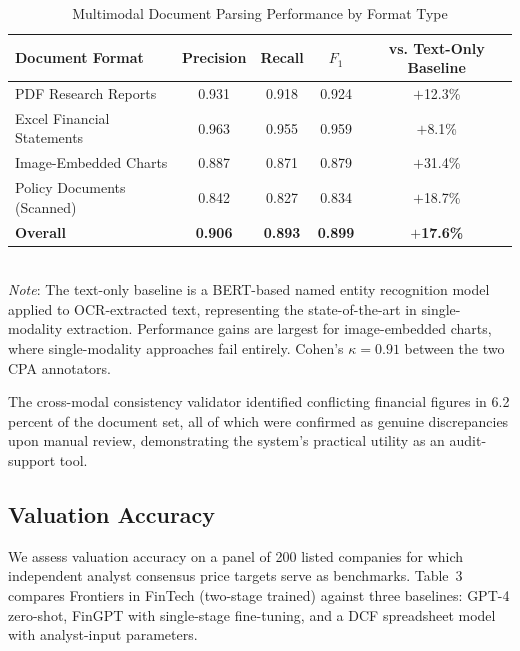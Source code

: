 \documentclass[12pt,letterpaper]{article}
\begin{document}
\begin{table}[H]
  \singlespacing
  \centering
  \caption{Multimodal Document Parsing Performance by Format Type}
  \label{tab:parsing}
  \begin{tabular}{@{}lcccc@{}}
    \toprule
    \textbf{Document Format} & \textbf{Precision} & \textbf{Recall}
      & \textbf{$F_1$} & \textbf{vs. Text-Only Baseline} \\
    \midrule
    PDF Research Reports       & 0.931 & 0.918 & 0.924 & $+$12.3\% \\
    Excel Financial Statements & 0.963 & 0.955 & 0.959 & $+$8.1\%  \\
    Image-Embedded Charts      & 0.887 & 0.871 & 0.879 & $+$31.4\% \\
    Policy Documents (Scanned) & 0.842 & 0.827 & 0.834 & $+$18.7\% \\
    \midrule
    \textbf{Overall}           & \textbf{0.906} & \textbf{0.893}
      & \textbf{0.899} & \textbf{$+$17.6\%} \\
    \bottomrule
  \end{tabular}
  \vspace{4pt}\\
  \footnotesize\textit{Note}: The text-only baseline is a BERT-based named
  entity recognition model applied to OCR-extracted text, representing
  the state-of-the-art in single-modality extraction. Performance gains
  are largest for image-embedded charts, where single-modality approaches
  fail entirely. Cohen's $\kappa = 0.91$ between the two CPA annotators.
\end{table}

The cross-modal consistency validator identified conflicting financial
figures in 6.2 percent of the document set, all of which were confirmed
as genuine discrepancies upon manual review, demonstrating the system's
practical utility as an audit-support tool.

\subsection{Valuation Accuracy}

We assess valuation accuracy on a panel of 200 listed companies for
which independent analyst consensus price targets serve as benchmarks.
Table~3 compares Frontiers in FinTech (two-stage trained) against three baselines:
GPT-4 zero-shot, FinGPT with single-stage fine-tuning, and a DCF
spreadsheet model with analyst-input parameters.
\end{document}
